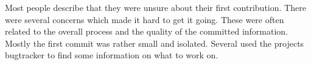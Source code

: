 Most people describe that they were unsure about their first contribution. There were several concerns which made it hard to get it going. These were often related to the overall process and the quality of the committed information. Mostly the first commit was rather small and isolated. Several used the projects bugtracker to find some information on what to work on.